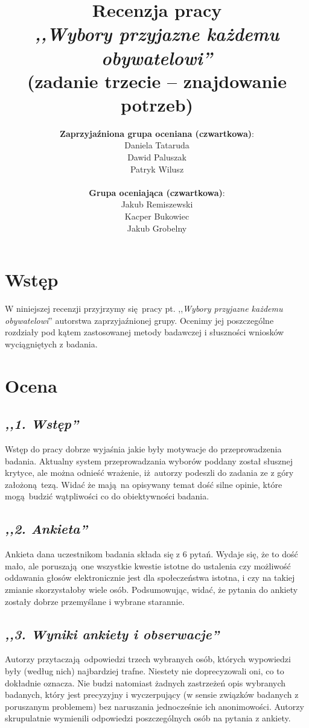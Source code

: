 \documentclass[12pt, a4paper, oneside]{article}
\title{Recenzja pracy\\ \textit{,,Wybory przyjazne każdemu obywatelowi''}\\
       \large(zadanie trzecie -- znajdowanie potrzeb)}
\date{}
\author{
    \textbf{Zaprzyjaźniona grupa oceniana \small(czwartkowa)}:
        \\ Daniela Tataruda
        \\ Dawid Paluszak
        \\ Patryk Wilusz\\
    \\\textbf{Grupa oceniająca \small(czwartkowa)}:
        \\ Jakub Remiszewski
        \\ Kacper Bukowiec
        \\ Jakub Grobelny
}
\begin{document}
\begin{titlepage}
    \maketitle
\end{titlepage}

\section*{Wstęp}

W niniejszej recenzji przyjrzymy się pracy pt. ,,\textit{Wybory przyjazne 
każdemu obywatelowi}'' autorstwa zaprzyjaźnionej grupy. Ocenimy jej 
poszczególne rozdziały pod kątem zastosowanej metody badawczej i słuszności 
wniosków wyciągniętych z badania. 

\section*{Ocena}

\subsection*{\textit{,,1. Wstęp''}}

Wstęp do pracy dobrze wyjaśnia jakie były motywacje do przeprowadzenia badania. 
Aktualny system przeprowadzania wyborów poddany został słusznej krytyce, ale 
można odnieść wrażenie, iż autorzy podeszli do zadania ze z góry założoną tezą. 
Widać że mają na opisywany temat dość silne opinie, które mogą budzić 
wątpliwości co do obiektywności badania.

\subsection*{\textit{,,2. Ankieta''}}

Ankieta dana uczestnikom badania składa się z 6 pytań. Wydaje się, że to dość 
mało, ale poruszają one wszystkie kwestie istotne do ustalenia czy możliwość 
oddawania głosów elektronicznie jest dla społeczeństwa istotna, i czy na takiej 
zmianie skorzystałoby wiele osób. Podsumowując, widać, że pytania do ankiety zostały dobrze przemyślane i wybrane starannie.

\subsection*{\textit{,,3. Wyniki ankiety i obserwacje''}}

Autorzy przytaczają odpowiedzi trzech wybranych osób, których wypowiedzi były 
(według nich) najbardziej trafne. Niestety nie doprecyzowali oni, co to 
dokładnie oznacza. Nie budzi natomiast żadnych zastrzeżeń opis wybranych 
badanych, który jest precyzyjny i wyczerpujący (w sensie związków badanych z poruszanym problemem) bez naruszania jednocześnie ich anonimowości. 
Autorzy skrupulatnie wymienili odpowiedzi poszczególnych osób na pytania z 
ankiety.
\end{document}
